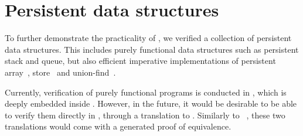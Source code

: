 \section{Persistent data structures}
\label{sec:persistent}

To further demonstrate the practicality of \Zoo, we verified a collection of persistent data structures.
This includes purely functional data structures such as persistent stack and queue, but also efficient imperative implementations of persistent array~\citep*{DBLP:conf/ml/ConchonF07}, store~\citep*{DBLP:journals/pacmpl/AllainC0S24} and union-find~\citep*{DBLP:journals/pacmpl/AllainC0S24}.

Currently, verification of purely functional programs is conducted in \ZooLang, which is deeply embedded inside \Rocq.
However, in the future, it would be desirable to be able to verify them directly in \Rocq, through a translation to \Gallina.
Similarly to \Hacspec~\citep*{DBLP:conf/cpp/HaselwarterHHWH24}, these two translations would come with a generated proof of equivalence.
